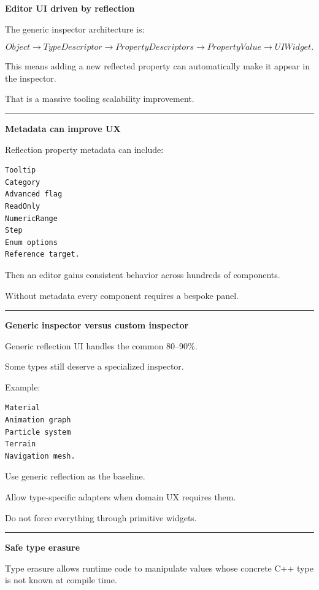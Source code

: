 \textbf{Editor UI driven by reflection}

The generic inspector architecture is:

\[
Object
\rightarrow
TypeDescriptor
\rightarrow
PropertyDescriptors
\rightarrow
PropertyValue
\rightarrow
UIWidget.
\]

This means adding a new reflected property can automatically make it appear in the inspector.

That is a massive tooling scalability improvement.

\begin{center}\rule{0.5\linewidth}{0.5pt}\end{center}

\textbf{Metadata can improve UX}

Reflection property metadata can include:

\begin{verbatim}
Tooltip
Category
Advanced flag
ReadOnly
NumericRange
Step
Enum options
Reference target.
\end{verbatim}

Then an editor gains consistent behavior across hundreds of components.

Without metadata every component requires a bespoke panel.

\begin{center}\rule{0.5\linewidth}{0.5pt}\end{center}

\textbf{Generic inspector versus custom inspector}

Generic reflection UI handles the common 80--90\%.

Some types still deserve a specialized inspector.

Example:

\begin{verbatim}
Material
Animation graph
Particle system
Terrain
Navigation mesh.
\end{verbatim}

Use generic reflection as the baseline.

Allow type-specific adapters when domain UX requires them.

Do not force everything through primitive widgets.

\begin{center}\rule{0.5\linewidth}{0.5pt}\end{center}

\textbf{Safe type erasure}

Type erasure allows runtime code to manipulate values whose concrete C++ type is not known at compile time.

